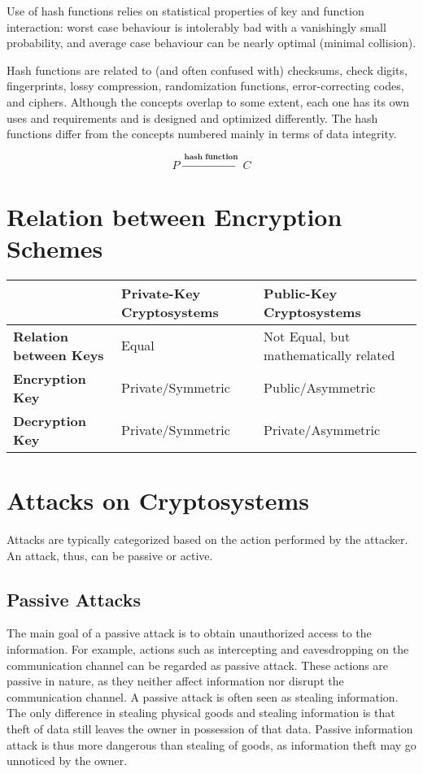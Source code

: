 \documentclass[british]{report}
\providecommand{\tabularnewline}{\\}
\begin{document}
Use of hash functions relies on statistical properties of key and
function interaction: worst case behaviour is intolerably bad with
a vanishingly small probability, and average case behaviour can be
nearly optimal (minimal collision).

Hash functions are related to (and often confused with) checksums,
check digits, fingerprints, lossy compression, randomization functions,
error-correcting codes, and ciphers. Although the concepts overlap
to some extent, each one has its own uses and requirements and is
designed and optimized differently. The hash functions differ from
the concepts numbered mainly in terms of data integrity.

\[
	P\xrightarrow{\:\textbf{hash function}\:}C
\]


\section{Relation between Encryption Schemes}
\begin{center}
	\begin{tabular}{|l||l|l|}
		\hline
		                               & \textbf{Private-Key Cryptosystems} & \textbf{Public-Key Cryptosystems}\tabularnewline
		\hline
		\hline
		\textbf{Relation between Keys} & Equal                              & Not Equal, but mathematically related\tabularnewline
		\hline
		\textbf{Encryption Key}        & Private/Symmetric                  & Public/Asymmetric\tabularnewline
		\hline
		\textbf{Decryption Key}        & Private/Symmetric                  & Private/Asymmetric\tabularnewline
		\hline
	\end{tabular}
	\par\end{center}

\section{Attacks on Cryptosystems}

Attacks are typically categorized based on the action performed by
the attacker. An attack, thus, can be passive or active.

\subsection{Passive Attacks}

The main goal of a passive attack is to obtain unauthorized access
to the information. For example, actions such as intercepting and
eavesdropping on the communication channel can be regarded as passive
attack. These actions are passive in nature, as they neither affect
information nor disrupt the communication channel. A passive attack
is often seen as stealing information. The only difference in stealing
physical goods and stealing information is that theft of data still
leaves the owner in possession of that data. Passive information attack
is thus more dangerous than stealing of goods, as information theft
may go unnoticed by the owner.
\end{document}
